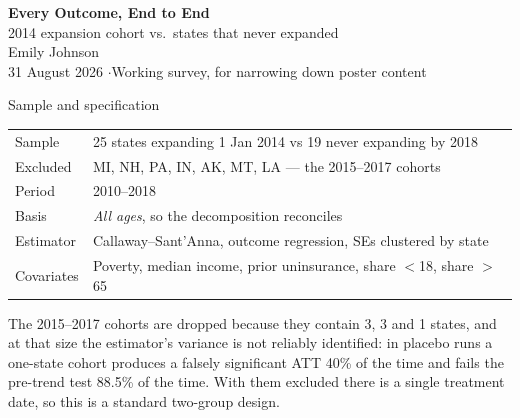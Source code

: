 \documentclass[aspectratio=169,11pt]{beamer}
\begin{document}
{
\begin{frame}[plain]
  \vfill
  \begin{center}
    {\huge\bfseries\color{DeepNavy} Every Outcome, End to End}\\[0.35cm]
    {\large\color{WarmGray} 2014 expansion cohort vs.\ states that never expanded}\\[1.1cm]
    {\normalsize\color{DeepNavy} Emily Johnson}\\[0.15cm]
    {\small\color{WarmGray} 31 August 2026 \quad$\cdot$\quad Working survey, for narrowing down poster content}
  \end{center}
  \vfill
\end{frame}}

\begin{frame}{Sample and specification}
  \vspace{0.15cm}
  \begin{center}
  {\normalsize
  \begin{tabular}{@{}l l@{}}
    \toprule
    Sample & 25 states expanding 1 Jan 2014 vs 19 never expanding by 2018 \\
    Excluded & MI, NH, PA, IN, AK, MT, LA --- the 2015--2017 cohorts \\
    Period & 2010--2018 \\
    Basis & \textit{All ages}, so the decomposition reconciles \\
    Estimator & Callaway--Sant'Anna, outcome regression, SEs clustered by state \\
    Covariates & Poverty, median income, prior uninsurance, share $<$18, share $>$65 \\
    \bottomrule
  \end{tabular}}
  \end{center}
  \vspace{0.3cm}
  {\footnotesize\color{WarmGray} The 2015--2017 cohorts are dropped because they contain 3, 3 and 1 states, and at that size the estimator's variance is not reliably identified: in placebo runs a one-state cohort produces a falsely significant ATT 40\% of the time and fails the pre-trend test 88.5\% of the time. With them excluded there is a single treatment date, so this is a standard two-group design.}
\end{frame}
\end{document}
